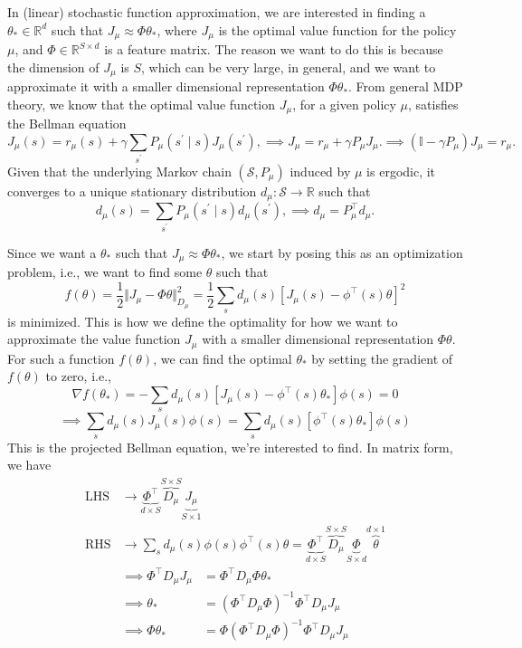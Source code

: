 In (linear) stochastic function approximation, we are interested in finding a \( \theta_\ast \in \mathbb{R}^{d} \) such that \( J_\mu \approx \Phi \theta_\ast \), where \( J_\mu \) is the optimal value function for the policy \( \mu \), and \( \Phi \in \mathbb{R}^{S \times d} \) is a feature matrix.
The reason we want to do this is because the dimension of \( J_\mu \) is \( S \), which can be very large, in general, and we want to approximate it with a smaller dimensional representation \( \Phi \theta_\ast \).
From general MDP theory, we know that the optimal value function \( J_\mu \), for a given policy \( \mu \), satisfies the Bellman equation
\[
    J_\mu(s) = r_{\mu}(s) + \gamma \sum_{s^{\prime}} P_{\mu}(s^{\prime} \mid s) J_\mu(s^{\prime}),
    \implies
    J_\mu = r_{\mu} + \gamma P_{\mu} J_\mu.
    \implies
    \left(\mathbb{I}-\gamma P_{\mu}\right) J_\mu = r_{\mu}.
\]
Given that the underlying Markov chain \( \left(\mathcal{S}, P_{\mu}\right) \) induced by \( \mu \) is ergodic, it converges to a unique stationary distribution \( d_{\mu}: \mathcal{S} \rightarrow \mathbb{R} \) such that
\[
    d_{\mu}(s) = \sum_{s^{\prime}} P_{\mu}(s^{\prime} \mid s) d_{\mu}(s^{\prime}),
    \implies
    d_{\mu} = P_{\mu}^{\top} d_{\mu}.
\]

Since we want a \( \theta_\ast \) such that \( J_\mu \approx \Phi \theta_\ast \), we start by posing this as an optimization problem, i.e., we want to find some \( \theta \) such that
\[
    f(\theta) = \frac{1}{2} \Vert J_\mu - \Phi \theta \Vert_{D_{\mu}}^2
    = \frac{1}{2} \sum_{s} d_{\mu}(s) {\left[ J_\mu(s) - \phi^\top(s) \theta \right]}^2
\]
is minimized.
This is how we define the optimality for how we want to approximate the value function \( J_\mu \) with a smaller dimensional representation \( \Phi \theta \).
For such a function \( f(\theta) \), we can find the optimal \( \theta_\ast \) by setting the gradient of \( f(\theta) \) to zero, i.e.,
\[
    \nabla f(\theta_\ast) = - \sum_{s} d_{\mu}(s) \left[ J_\mu(s) - \phi^\top(s) \theta_\ast \right] \phi(s) = 0
\]
\[
    \implies
    \sum_{s} d_{\mu}(s) J_\mu(s) \phi(s) = \sum_{s} d_{\mu}(s) {\left[ \phi^\top(s) \theta_\ast \right]} \phi(s)
\]
This is the projected Bellman equation, we're interested to find.
In matrix form, we have
\begin{align*}
    \text{LHS}
     & \to
    \underbrace{\Phi^\top}_{d \times S} \overbrace{D_\mu}^{S \times S} \underbrace{J_\mu}_{S \times 1}
    \\
    \text{RHS}
     & \to
    \sum_{s} d_\mu(s) \phi(s) \phi^\top(s) \theta = \underbrace{\Phi^\top}_{d \times S} \overbrace{D_\mu}^{S \times S} \underbrace{\Phi}_{S \times d} \overbrace{\theta}^{d \times 1}
\end{align*}
\begin{align*}
    \implies
    \Phi^\top D_\mu J_\mu
     & =
    \Phi^\top D_\mu \Phi \theta_\ast
    \\
    \implies
    \theta_\ast
     & =
    {(\Phi^\top D_\mu \Phi)}^{-1} \Phi^\top D_\mu J_\mu
    \\
    \implies
    \Phi \theta_\ast
     & =
    \Phi {(\Phi^\top D_\mu \Phi)}^{-1} \Phi^\top D_\mu J_\mu
\end{align*}

